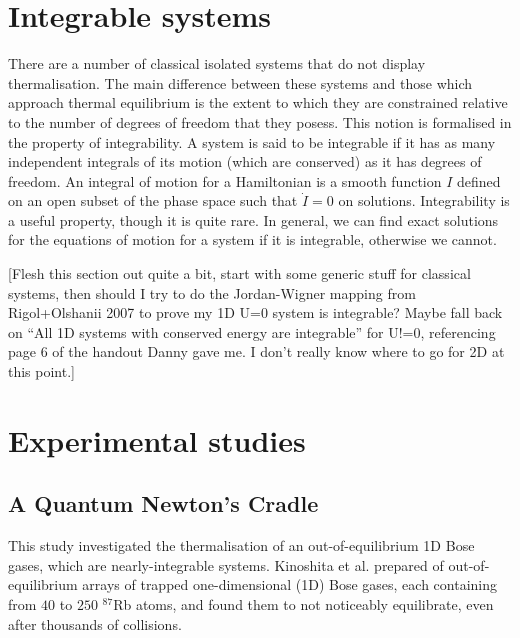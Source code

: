 \documentclass[a4paper,10pt]{article}
\begin{document}
\section{Integrable systems}
There are a number of classical isolated systems that do not display thermalisation. The main difference between these systems and those which approach thermal equilibrium is the extent to which
they are constrained relative to the number of degrees of freedom that they posess. This notion is formalised in the property of integrability. A system is said to be integrable if it has  as 
many independent integrals of its motion (which are conserved) as it has degrees of freedom. An integral of motion for a Hamiltonian is a smooth function $I$ defined on an open subset of the 
phase space such that $\dot{I}=0$ on solutions. Integrability is a useful property, though it is quite rare. In general, we can find exact solutions 
for the equations of motion for a system if it is integrable, otherwise we cannot. 


 [Flesh this section out quite a bit, start with some generic stuff for classical systems, then should I try to do the Jordan-Wigner mapping from Rigol+Olshanii 2007
to prove my 1D U=0 system is integrable? Maybe fall back on ``All 1D systems with conserved energy are integrable'' for U!=0, referencing page 6 of the handout Danny gave me. I don't really know where 
to go for 2D at this point.]


\section{Experimental studies}
\subsection{A Quantum Newton's Cradle\cite{Kinoshita2006}}
This study investigated the thermalisation of an out-of-equilibrium 1D Bose gases, which are nearly-integrable systems. Kinoshita et al. prepared
of out-of-equilibrium arrays of trapped one-dimensional (1D) Bose gases, each containing from $40$ to $250$ $^{87}$Rb atoms, and found them to not noticeably equilibrate,
even after thousands of collisions. 
\end{document}
